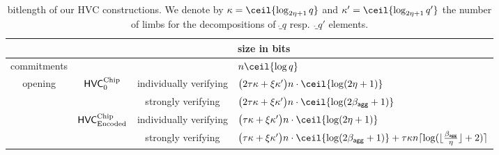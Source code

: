 \begin{remark}
\begin{table}\centering
 \begin{tabular}{ccc@{\hskip 3.5ex}l}
  & & & size in bits \\\toprule
  commitments & & & $n\ceil{\log q}$\\
  \hline
  \multirow{4}{*}{opening}& \multirow{2}{*}{$\mathsf{HVC}^{\textup{Chip}}_{0}$} &individually verifying & $\bigl(2\tau\limbs + \xi\limbs'\bigr)n\cdot \ceil{\log(2\eta+1)}$\\\cline{3-4}
                          &                                   &strongly verifying & $\bigl(2\tau\limbs + \xi\limbs'\bigr)n\cdot \ceil{\log(2\bagg+1)}$  \\\cline{2-4}
                          & \multirow{2}{*}{$\mathsf{HVC}_{\textup{Encoded}}^{\textup{Chip}}$}    &individually verifying & $\bigl(\tau\limbs + \xi\limbs'\bigr)n\cdot \ceil{\log(2\eta+1)}$\\\cline{3-4}
                          &                                   &strongly verifying & $\bigl(\tau\limbs + \xi\limbs'\bigr)n\cdot \ceil{\log(2\bagg+1)}+ \tau\limbs n\normalceil{\log (\lfloor\frac{\bagg}{\eta}\rfloor+2)}$\\
                          \hline
 \end{tabular}
 \medskip %
 \caption{bitlength of our HVC constructions. We denote by $\limbs = \ceil{\log_{2\eta+1}q}$ and $\limbs' = \ceil{\log_{2\eta+1}q'}$ the number of limbs for the decompositions of $\ring_q$ resp.\ $\ring_{q'}$ elements.}
 \label{table:hvcsizes}
\end{table}
\end{remark}
